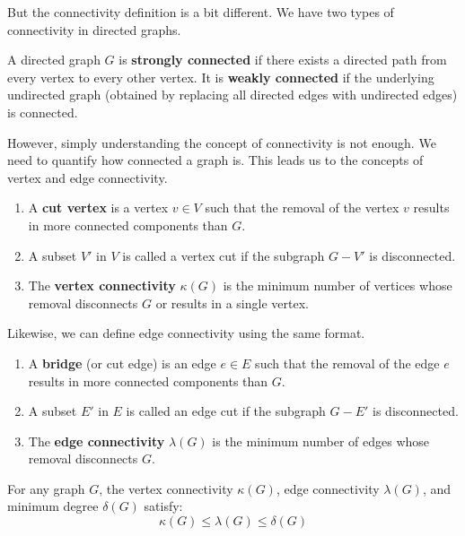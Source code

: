 But the connectivity definition is a bit different. We have two types of connectivity in directed graphs.

\begin{definition}
A directed graph $G$ is \textbf{strongly connected} if there exists a directed path from every vertex to every other vertex. It is \textbf{weakly connected} if the underlying undirected graph (obtained by replacing all directed edges with undirected edges) is connected.
\end{definition}

However, simply understanding the concept of connectivity is not enough. We need to quantify how connected a graph is. This leads us to the concepts of vertex and edge connectivity.

\begin{definition}
\begin{enumerate}
    \item A \textbf{cut vertex} is a vertex $v \in V$ such that the removal of the vertex $v$ results in more connected components than $G$.
    \item A subset $V'$ in $V$ is called a vertex cut if the subgraph $G-V'$ is disconnected.
    \item The \textbf{vertex connectivity} $\kappa(G)$ is the minimum number of vertices whose removal disconnects $G$ or results in a single vertex.
\end{enumerate}
\end{definition}

Likewise, we can define edge connectivity using the same format.

\begin{definition}
\begin{enumerate}
    \item A \textbf{bridge} (or cut edge) is an edge $e \in E$ such that the removal of the edge $e$ results in more connected components than $G$.
    \item A subset $E'$ in $E$ is called an edge cut if the subgraph $G-E'$ is disconnected.
    \item The \textbf{edge connectivity} $\lambda(G)$ is the minimum number of edges whose removal disconnects $G$.
\end{enumerate}
\end{definition}

\begin{theorem}
For any graph $G$, the vertex connectivity $\kappa(G)$, edge connectivity $\lambda(G)$, and minimum degree $\delta(G)$ satisfy:
\[ \kappa(G) \le \lambda(G) \le \delta(G) \]
\end{theorem}

